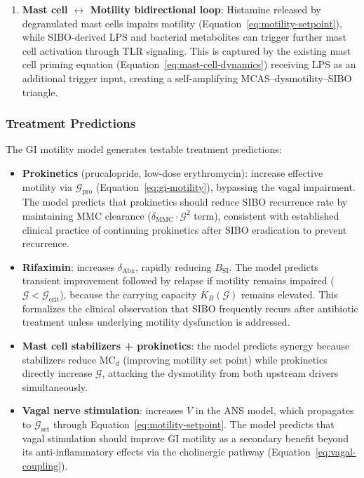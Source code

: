\begin{enumerate}
    \item \textbf{Mast cell $\leftrightarrow$ Motility bidirectional loop}: Histamine released by degranulated mast cells impairs motility (Equation~\ref{eq:motility-setpoint}), while SIBO-derived LPS and bacterial metabolites can trigger further mast cell activation through TLR signaling. This is captured by the existing mast cell priming equation (Equation~\ref{eq:mast-cell-dynamics}) receiving LPS as an additional trigger input, creating a self-amplifying MCAS--dysmotility--SIBO triangle.
\end{enumerate}

\subsubsection{Treatment Predictions}

The GI motility model generates testable treatment predictions:

\begin{itemize}
    \item \textbf{Prokinetics} (prucalopride, low-dose erythromycin): increase effective motility via $\mathcal{G}_{\text{pro}}$ (Equation~\ref{eq:gi-motility}), bypassing the vagal impairment. The model predicts that prokinetics should reduce SIBO recurrence rate by maintaining MMC clearance ($\delta_{\text{MMC}} \cdot \mathcal{G}^2$ term), consistent with established clinical practice of continuing prokinetics after SIBO eradication to prevent recurrence.
    \item \textbf{Rifaximin}: increases $\delta_{\text{Abx}}$, rapidly reducing $B_{\text{SI}}$. The model predicts transient improvement followed by relapse if motility remains impaired ($\mathcal{G} < \mathcal{G}_{\text{crit}}$), because the carrying capacity $K_B(\mathcal{G})$ remains elevated. This formalizes the clinical observation that SIBO frequently recurs after antibiotic treatment unless underlying motility dysfunction is addressed.
    \item \textbf{Mast cell stabilizers + prokinetics}: the model predicts synergy because stabilizers reduce $\text{MC}_d$ (improving motility set point) while prokinetics directly increase $\mathcal{G}$, attacking the dysmotility from both upstream drivers simultaneously.
    \item \textbf{Vagal nerve stimulation}: increases $V$ in the ANS model, which propagates to $\mathcal{G}_{\text{set}}$ through Equation~\ref{eq:motility-setpoint}. The model predicts that vagal stimulation should improve GI motility as a secondary benefit beyond its anti-inflammatory effects via the cholinergic pathway (Equation~\ref{eq:vagal-coupling}).
\end{itemize}

